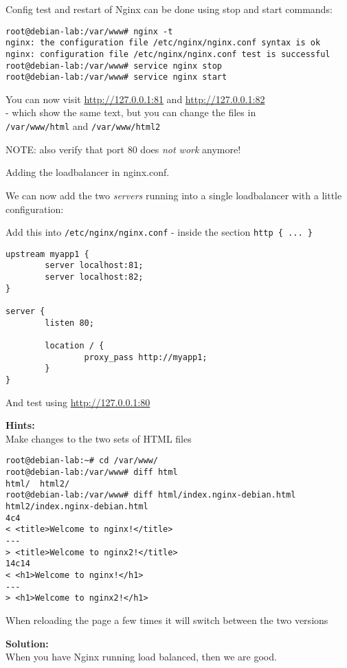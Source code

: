 \documentclass[a4paper,11pt,notitlepage]{report}
\begin{document}
Config test and restart of Nginx can be done using stop and start commands:

\begin{verbatim}
root@debian-lab:/var/www# nginx -t
nginx: the configuration file /etc/nginx/nginx.conf syntax is ok
nginx: configuration file /etc/nginx/nginx.conf test is successful
root@debian-lab:/var/www# service nginx stop
root@debian-lab:/var/www# service nginx start
\end{verbatim}

You can now visit \url{http://127.0.0.1:81} and \url{http://127.0.0.1:82}\\
 - which show the same text, but you can change the files in \\
 \verb+/var/www/html+ and \verb+/var/www/html2+

NOTE: also verify that port 80 does \emph{not work} anymore!

Adding the loadbalancer in nginx.conf.

We can now add the two \emph{servers} running into a single loadbalancer with a little configuration:

Add this into \verb+/etc/nginx/nginx.conf+ - inside the section \verb+http { ... }+
\begin{verbatim}
upstream myapp1 {
        server localhost:81;
        server localhost:82;
}

server {
        listen 80;

        location / {
                proxy_pass http://myapp1;
        }
}
\end{verbatim}

And test using \url{http://127.0.0.1:80}



{\bf Hints:}\\
Make changes to the two sets of HTML files

\begin{verbatim}
root@debian-lab:~# cd /var/www/
root@debian-lab:/var/www# diff html
html/  html2/
root@debian-lab:/var/www# diff html/index.nginx-debian.html html2/index.nginx-debian.html
4c4
< <title>Welcome to nginx!</title>
---
> <title>Welcome to nginx2!</title>
14c14
< <h1>Welcome to nginx!</h1>
---
> <h1>Welcome to nginx2!</h1>
\end{verbatim}

When reloading the page a few times it will switch between the two versions

{\bf Solution:}\\
When you have Nginx running load balanced, then we are good.
\end{document}
